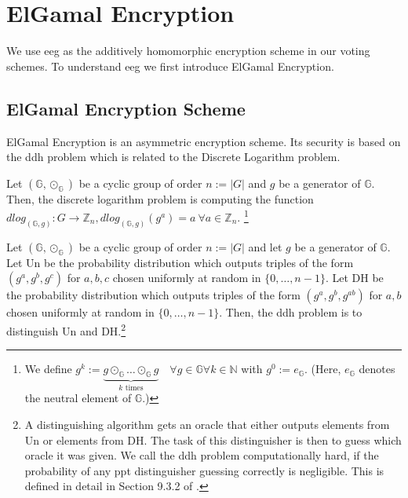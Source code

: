\chapter{ElGamal Encryption}
\label{chap:elGamalEncryption}

We use \gls{eeg} as the additively homomorphic encryption scheme in our voting schemes.
To understand \gls{eeg} we first introduce ElGamal Encryption.

\section{ElGamal Encryption Scheme}
ElGamal Encryption is an asymmetric encryption scheme. 
Its security is based on the \gls{ddh} problem which is related to the Discrete Logarithm problem.

\begin{definition}
    Let $(\mathbb{G}, \odot_{\mathbb{G}})$ be a cyclic group of order $n:=|G|$ and $g$ be a generator of $\mathbb{G}$.
    Then, the discrete logarithm problem is computing the function $dlog_{(\mathbb{G},g)}:G\to\mathbb{Z}_n, dlog_{(\mathbb{G},g)}(g^{a})=a\:\forall a\in\mathbb{Z}_n$.
    \footnote{\label{footnote:groupExponentiation} 
        We define $g^k := \underbrace{g\odot_{\mathbb{G}}\dots\odot_{\mathbb{G}}g}_{k \text{ times}}\quad\forall g\in\mathbb{G}\forall k\in\mathbb{N}$ with $g^0:=e_{\mathbb{G}}$. (Here, $e_{\mathbb{G}}$ denotes the neutral element of $\mathbb{G}$.)
    }
\end{definition}

\begin{definition}
    Let $(\mathbb{G}, \odot_{\mathbb{G}})$ be a cyclic group of order $n:=|G|$ and let $g$ be a generator of $\mathbb{G}$.
    Let $\text{Un}$ be the probability distribution which outputs triples of the form $(g^{a}, g^{b}, g^{c})$ for $a, b, c$ chosen uniformly at random in $\{0, \dots, n-1\}$.
    Let $\text{DH}$ be the probability distribution which outputs triples of the form $(g^{a}, g^{b}, g^{ab})$ for $a, b$ chosen uniformly at random in $\{0, \dots, n-1\}$.
    Then, the \gls{ddh} problem is to distinguish $\text{Un}$ and $\text{DH}$.\footnote{
        \label{footnote:ddhProblemFormally}
        A distinguishing algorithm gets an oracle that either outputs elements from $\text{Un}$ or elements from $\text{DH}$.
        The task of this distinguisher is then to guess which oracle it was given. 
        We call the \gls{ddh} problem computationally hard, if the probability of any ppt distinguisher guessing correctly is negligible.
        This is defined in detail in Section 9.3.2 of \cite{katz_introduction_2021}.
    }
\end{definition}

